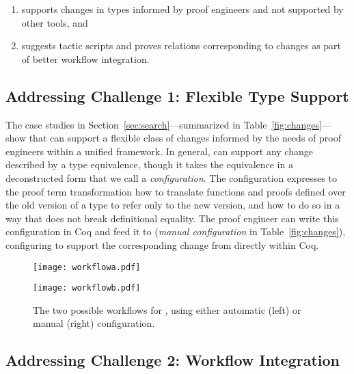 \begin{enumerate}
\item supports changes in types informed by proof engineers and not supported by other tools, and
\item suggests tactic scripts and proves relations corresponding to changes as part of better workflow integration.
\end{enumerate}

\subsection*{Addressing Challenge 1: Flexible Type Support}

The case studies in Section~\ref{sec:search}---summarized in Table~\ref{fig:changes}---show that \toolname can support a flexible class of changes informed by the needs of proof engineers within a unified framework.
In general, \toolname can support any change described by a type equivalence, though it takes the equivalence in a
deconstructed form that we call a \textit{configuration}.
The configuration expresses to the proof term transformation how to translate functions and proofs defined over the old version of a type
to refer only to the new version, and how to do so in a way that does not break definitional equality.
The proof engineer can write this configuration in Coq and feed it to \toolname (\textit{manual configuration} in Table~\ref{fig:changes}),
configuring \toolname to support the corresponding change from directly within Coq.

\begin{figure*}
\begin{minipage}{0.52\textwidth}
\texttt{[image: workflowa.pdf]}
\end{minipage}
\hfill
\begin{minipage}{0.45\textwidth}
\texttt{[image: workflowb.pdf]}
\vspace{0.97cm}
\end{minipage}
\vspace{-0.4cm}
\caption{The two possible workflows for \toolname, using either automatic (left) or manual (right) configuration.}
\label{fig:system}
\end{figure*}

\subsection*{Addressing Challenge 2: Workflow Integration}

